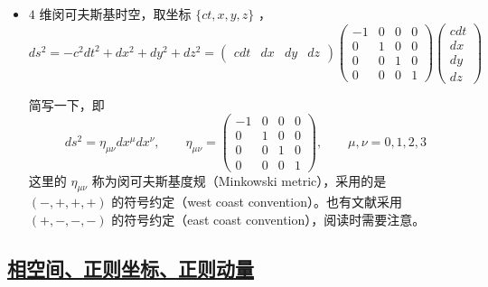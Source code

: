 \begin{itemize}
    简写一下，即
    \begin{equation}
        ds^2 = 
        g_{ij} dx^i dx^j   ,\qquad
        g_{ij} = 
        \begin{pmatrix}
            1 & 0\\
            0 & r^2
        \end{pmatrix}
        ,\qquad i,j = r,\phi
    \end{equation}
    \item $4$ 维闵可夫斯基时空，取坐标 $\{ct,x,y,z\}$ ，
    \begin{equation}
        ds^2 = -c^2dt^2 + dx^2 + dy^2 + dz^2 =
        \begin{pmatrix}
            cdt & dx & dy & dz
        \end{pmatrix}
        \begin{pmatrix}
            -1 & 0 & 0 & 0\\
            0 & 1 & 0 & 0\\
            0 & 0 & 1 & 0\\
            0 & 0 & 0 & 1
        \end{pmatrix}
        \begin{pmatrix}
            cdt\\ dx\\ dy\\ dz
        \end{pmatrix}
    \end{equation}

    简写一下，即
    \begin{equation}
        ds^2 = 
        \eta_{\mu\nu} dx^\mu dx^\nu   ,\qquad
        \eta_{\mu\nu} = 
        \begin{pmatrix}
            -1 & 0 & 0 & 0\\
            0 & 1 & 0 & 0\\
            0 & 0 & 1 & 0\\
            0 & 0 & 0 & 1
        \end{pmatrix}
        ,\qquad \mu,\nu = 0,1,2,3
    \end{equation}
    这里的 $\eta_{\mu\nu}$ 称为闵可夫斯基度规（Minkowski metric），采用的是 $(-,+,+,+)$ 的符号约定（west coast convention）。也有文献采用 $(+,-,-,-)$ 的符号约定（east coast convention），阅读时需要注意。
\end{itemize}


\subsection{\protect\hyperlink{:}{相空间、正则坐标、正则动量}}

